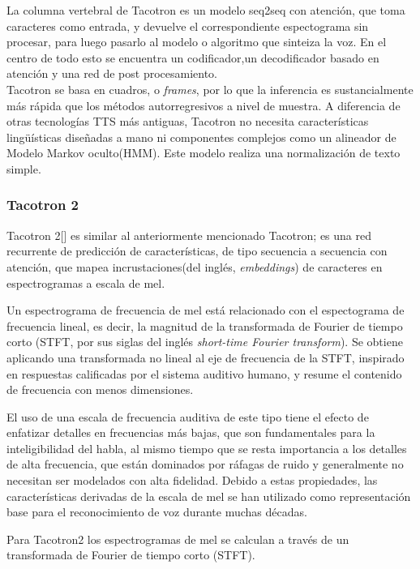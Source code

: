 La columna vertebral de Tacotron es un modelo seq2seq con atención, que toma caracteres como entrada, y devuelve el correspondiente espectograma sin procesar, para luego pasarlo al modelo o algoritmo que sinteiza la voz. En el centro de todo esto se encuentra un codificador,un decodificador basado en atención y una red de post procesamiento.\\

Tacotron se basa en cuadros, o \textit{frames}, por lo que la inferencia es sustancialmente más rápida que los métodos autorregresivos a nivel de muestra. A diferencia de otras tecnologías TTS más antiguas, Tacotron no necesita características lingüísticas diseñadas a mano ni componentes complejos como un alineador de Modelo Markov oculto(HMM). Este modelo realiza una normalización de texto simple.


\subsubsection{Tacotron 2}

Tacotron 2[\cite{shen2018natural}] es similar al anteriormente mencionado Tacotron; es una red recurrente de predicción de características, de tipo secuencia a secuencia con atención, que mapea incrustaciones(del inglés, \textit{embeddings}) de caracteres en espectrogramas a escala de mel. 

Un espectrograma de frecuencia de mel está relacionado con el espectograma de frecuencia lineal, es decir, la magnitud de la transformada de Fourier de tiempo corto (STFT, por sus siglas del inglés \textit{short-time Fourier transform}). Se obtiene aplicando una transformada no lineal al eje de frecuencia de la STFT, inspirado en respuestas calificadas por el sistema auditivo humano, y resume el contenido de frecuencia con menos dimensiones.

El uso de una escala de frecuencia auditiva de este tipo tiene el efecto de enfatizar detalles en frecuencias más bajas, que son fundamentales para la inteligibilidad del habla, al mismo tiempo que se resta importancia a los detalles de alta frecuencia, que están dominados por ráfagas de ruido y generalmente no necesitan ser modelados con alta fidelidad. Debido a estas propiedades, las características derivadas de la escala de mel se han utilizado como representación base para el reconocimiento de voz durante muchas décadas. 

Para Tacotron2 los espectrogramas de mel se calculan a través de un transformada de Fourier de tiempo corto (STFT). \\

